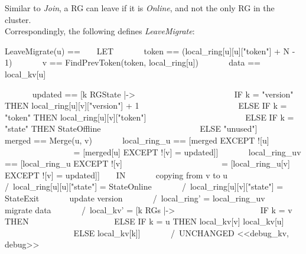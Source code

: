 Similar to \textit{Join}, a RG can leave if it is \textit{Online}, and not the
only RG in the cluster.\\

Correspondingly, the following defines \textit{LeaveMigrate}:\\
\begin{tla}
LeaveMigrate(u) == 
    LET 
        token == (local_ring[u][u]["token"] + N - 1) %
        v == FindPrevToken(token, local_ring[u])
        data == local_kv[u] 

        updated == [k \in RGState |-> 
                            IF k = "version" THEN local_ring[u][v]["version"] + 1
                            ELSE IF k = "token" THEN local_ring[u][v]["token"]
                            ELSE IF k = "state" THEN StateOffline
                            ELSE "unused"]
        merged == Merge(u, v)
        local_ring_u == [merged EXCEPT ![u] 
                            = [merged[u] EXCEPT ![v] = updated]]
        local_ring_uv == [local_ring_u EXCEPT ![v] 
                            = [local_ring_u[v] EXCEPT ![v] = updated]]
    IN 
        \* copying from v to u
        /\ local_ring[u][u]["state"] = StateOnline
        /\ local_ring[u][v]["state"] = StateExit
        \* update version 
        /\ local_ring' = local_ring_uv
        \* migrate data
        /\ local_kv' = [k \in RGs |-> 
                        IF k = v THEN {} 
                        ELSE IF k = u THEN local_kv[v] \cup local_kv[u] 
                        ELSE local_kv[k]]
        /\ UNCHANGED <<debug_kv, debug>>
\end{tla}
